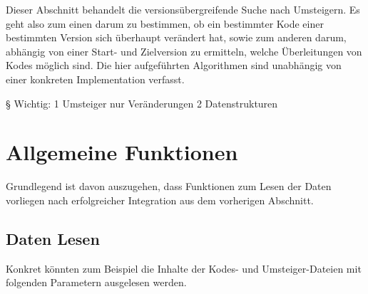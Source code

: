 Dieser Abschnitt behandelt die versionsübergreifende Suche nach Umsteigern. Es geht also zum einen darum zu bestimmen, ob ein bestimmter Kode einer bestimmten Version sich überhaupt verändert hat, sowie zum anderen darum, abhängig von einer Start- und Zielversion zu ermitteln, welche Überleitungen von Kodes möglich sind. Die hier aufgeführten Algorithmen sind unabhängig von einer konkreten Implementation verfasst. 

§ Wichtig: 1 Umsteiger nur Veränderungen 2 Datenstrukturen

\section{Allgemeine Funktionen}

Grundlegend ist davon auszugehen, dass Funktionen zum Lesen der Daten vorliegen nach erfolgreicher Integration aus dem vorherigen Abschnitt. 

\subsection{Daten Lesen}
\label{function-read-data}

Konkret könnten zum Beispiel die Inhalte der Kodes- und Umsteiger-Dateien mit folgenden Parametern ausgelesen werden. 


